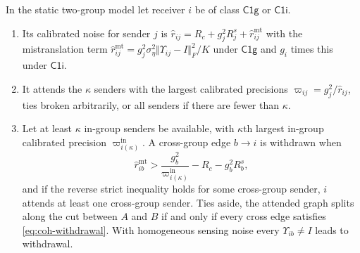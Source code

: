\begin{theorem}\label{thm:coh-withdrawal}
In the static two-group model let receiver $i$ be of class $\mathsf{C1g}$ or $\mathsf{C1i}$.
\begin{enumerate}\renewcommand{\labelenumi}{(\alph{enumi})}
\item Its calibrated noise for sender $j$ is $\hat r_{ij}=R_c+g_j^2R^s_j+\hat r^{\mathrm{mt}}_{ij}$ with the mistranslation term $\hat r^{\mathrm{mt}}_{ij}=g_j^2\sigma_\eta^2\Vert\Upsilon_{ij}-I\Vert_F^2/K$ under $\mathsf{C1g}$ and $g_i$ times this under $\mathsf{C1i}$.
\item It attends the $\kappa$ senders with the largest calibrated precisions $\varpi_{ij}=g_j^2/\hat r_{ij}$, ties broken arbitrarily, or all senders if there are fewer than $\kappa$.
\item Let at least $\kappa$ in-group senders be available, with $\kappa$th largest in-group calibrated precision $\varpi^{\mathrm{in}}_{i(\kappa)}$. A cross-group edge $b\to i$ is withdrawn when
\begin{equation}\label{eq:coh-withdrawal}
\hat r^{\mathrm{mt}}_{ib}>\frac{g_b^2}{\varpi^{\mathrm{in}}_{i(\kappa)}}-R_c-g_b^2R^s_b,
\end{equation}
and if the reverse strict inequality holds for some cross-group sender, $i$ attends at least one cross-group sender. Ties aside, the attended graph splits along the cut between $A$ and $B$ if and only if every cross edge satisfies \eqref{eq:coh-withdrawal}. With homogeneous sensing noise every $\Upsilon_{ib}\ne I$ leads to withdrawal.
\end{enumerate}
\end{theorem}

